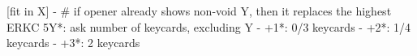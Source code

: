 [fit in X] - 
# if opener already shows non-void Y, then it replaces the highest ERKC
5Y*: ask number of keycards, excluding Y
   - +1*: 0/3 keycards
   - +2*: 1/4 keycards
   - +3*: 2 keycards